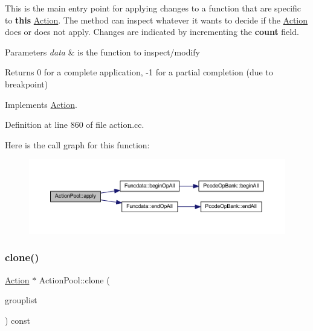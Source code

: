 This is the main entry point for applying changes to a function that are specific to {\bfseries{this}} \mbox{\hyperlink{class_action}{Action}}. The method can inspect whatever it wants to decide if the \mbox{\hyperlink{class_action}{Action}} does or does not apply. Changes are indicated by incrementing the {\bfseries{count}} field. 
\begin{DoxyParams}{Parameters}
{\em data} & is the function to inspect/modify \\
\hline
\end{DoxyParams}
\begin{DoxyReturn}{Returns}
0 for a complete application, -\/1 for a partial completion (due to breakpoint) 
\end{DoxyReturn}


Implements \mbox{\hyperlink{class_action_aac1c3999d6c685b15f5d9765a4d04173}{Action}}.



Definition at line 860 of file action.\+cc.

Here is the call graph for this function\+:
\nopagebreak
\begin{figure}[H]
\begin{center}
\leavevmode
\includegraphics[width=350pt]{class_action_pool_ad7b2ba46cad39369c0831cbfcc654802_cgraph}
\end{center}
\end{figure}
\mbox{\label{class_action_pool_a96a6ada9201cdf36d2ed452d0c831725}} 
\subsubsection{\texorpdfstring{clone()}{clone()}}
{\footnotesize\ttfamily \mbox{\hyperlink{class_action}{Action}} $\ast$ Action\+Pool\+::clone (\begin{DoxyParamCaption}\item[{const \mbox{\hyperlink{class_action_group_list}{Action\+Group\+List}} \&}]{grouplist }\end{DoxyParamCaption}) const\hspace{0.3cm}{\ttfamily [virtual]}}



